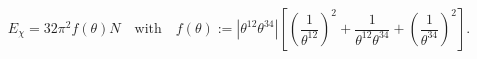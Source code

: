 \begin{equation}\label{eq:energy-chi}
 E_\chi=32\pi^2 f(\theta) N\quad\text{with}\quad f(\theta)
 :=|\theta^{12}\theta^{34}|\left[\left(\frac{1}{\theta^{12}}
 \right)^2+\frac{1}{\theta^{12}\theta^{34}}+\left(
 \frac{1}{\theta^{34}}\right)^2\right].
\end{equation}

